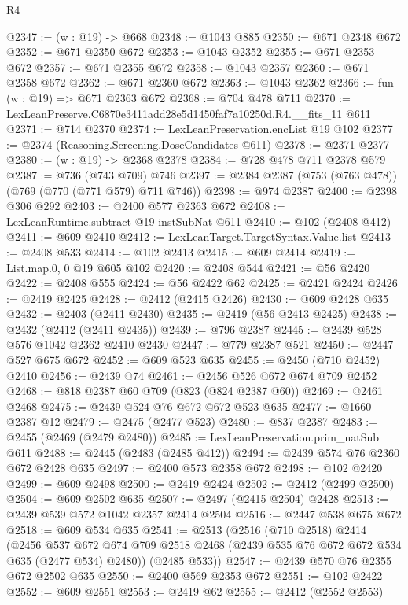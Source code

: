 \begin{lexlean}{R4}
\begin{coremodule}
@2347 := (w : @19) -> @668
@2348 := @1043 @885
@2350 := @671 @2348 @672
@2352 := @671 @2350 @672
@2353 := @1043 @2352
@2355 := @671 @2353 @672
@2357 := @671 @2355 @672
@2358 := @1043 @2357
@2360 := @671 @2358 @672
@2362 := @671 @2360 @672
@2363 := @1043 @2362
@2366 := fun (w : @19) => @671 @2363 @672
@2368 := @704 @478 @711
@2370 := LexLeanPreserve.C6870e3411add28e5d1450faf7a10250d.R4.__fits_11 @611
@2371 := @714 @2370
@2374 := LexLeanPreservation.encList @19 @102
@2377 := @2374 (Reasoning.Screening.DoseCandidates @611)
@2378 := @2371 @2377
@2380 := (w : @19) -> @2368 @2378
@2384 := @728 @478 @711 @2378 @579
@2387 := @736 (@743 @709) @746
@2397 := @2384 @2387 (@753 (@763 @478)) (@769 (@770 (@771 @579) @711 @746))
@2398 := @974 @2387
@2400 := @2398 @306 @292
@2403 := @2400 @577 @2363 @672
@2408 := LexLeanRuntime.subtract @19 instSubNat @611
@2410 := @102 (@2408 @412)
@2411 := @609 @2410
@2412 := LexLeanTarget.TargetSyntax.Value.list
@2413 := @2408 @533
@2414 := @102 @2413
@2415 := @609 @2414
@2419 := List.map.{0, 0} @19 @605 @102
@2420 := @2408 @544
@2421 := @56 @2420
@2422 := @2408 @555
@2424 := @56 @2422 @62
@2425 := @2421 @2424
@2426 := @2419 @2425
@2428 := @2412 (@2415 @2426)
@2430 := @609 @2428 @635
@2432 := @2403 (@2411 @2430)
@2435 := @2419 (@56 @2413 @2425)
@2438 := @2432 (@2412 (@2411 @2435))
@2439 := @796 @2387
@2445 := @2439 @528 @576 @1042 @2362 @2410 @2430
@2447 := @779 @2387 @521
@2450 := @2447 @527 @675 @672
@2452 := @609 @523 @635
@2455 := @2450 (@710 @2452) @2410
@2456 := @2439 @74
@2461 := @2456 @526 @672 @674 @709 @2452
@2468 := @818 @2387 @60 @709 (@823 (@824 @2387 @60))
@2469 := @2461 @2468
@2475 := @2439 @524 @76 @672 @672 @523 @635
@2477 := @1660 @2387 @12
@2479 := @2475 (@2477 @523)
@2480 := @837 @2387
@2483 := @2455 (@2469 (@2479 @2480))
@2485 := LexLeanPreservation.prim_natSub @611
@2488 := @2445 (@2483 (@2485 @412))
@2494 := @2439 @574 @76 @2360 @672 @2428 @635
@2497 := @2400 @573 @2358 @672
@2498 := @102 @2420
@2499 := @609 @2498
@2500 := @2419 @2424
@2502 := @2412 (@2499 @2500)
@2504 := @609 @2502 @635
@2507 := @2497 (@2415 @2504) @2428
@2513 := @2439 @539 @572 @1042 @2357 @2414 @2504
@2516 := @2447 @538 @675 @672
@2518 := @609 @534 @635
@2541 := @2513
    (@2516
      (@710 @2518)
      @2414
      (@2456
        @537
        @672
        @674
        @709
        @2518
        @2468
        (@2439 @535 @76 @672 @672 @534 @635 (@2477 @534) @2480))
      (@2485 @533))
@2547 := @2439 @570 @76 @2355 @672 @2502 @635
@2550 := @2400 @569 @2353 @672
@2551 := @102 @2422
@2552 := @609 @2551
@2553 := @2419 @62
@2555 := @2412 (@2552 @2553)

\end{coremodule}
\end{lexlean}
